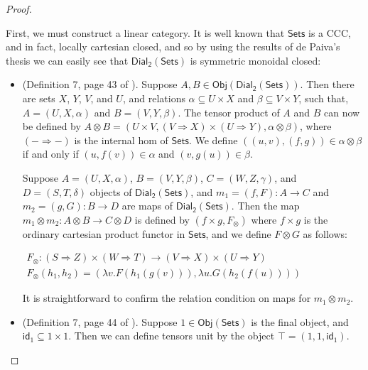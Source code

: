 \documentclass{elsarticle}
\newcommand{\dial}[0]{\mathsf{Dial_2}(\mathsf{Sets})}
\newcommand{\sets}[0]{\mathsf{Sets}}
\newcommand{\obj}[1]{\mathsf{Obj}(#1)}
\newcommand{\id}[0]{\mathsf{id}}
\begin{document}
\begin{proof}
\begin{report}
  First, we must construct a linear category. It is well known that
  $\mathsf{Sets}$ is a CCC, and in fact, locally cartesian closed, and
  so by using the results of de Paiva's thesis we can easily see that
  $\dial$ is symmetric monoidal closed:
  \begin{center}
    \begin{itemize}
    \item (Definition 7, page 43 of \cite{dePaiva:1988}). Suppose
      $A,B \in \obj{\dial}$.  Then there are sets $X$, $Y$, $V$, and
      $U$, and relations $\alpha \subseteq U \times X$ and
      $\beta \subseteq V \times Y$, such that, $A = (U,X,\alpha)$ and
      $B = (V,Y,\beta)$.  The tensor product of $A$ and $B$ can now be
      defined by $A \otimes B = (U \times V, (V \Rightarrow X) \times
      (U \Rightarrow Y),\alpha \otimes \beta)$, where $(- \Rightarrow
      -)$ is the internal hom of $\mathsf{Sets}$.  We define
      $((u,v),(f,g)) \in \alpha \otimes \beta$ if and only if
      $(u,f(v)) \in \alpha$ and $(v,g(u)) \in \beta$.  

      Suppose $A = (U,X,\alpha)$, $B = (V,Y,\beta)$,
      $C = (W,Z,\gamma)$, and $D = (S,T,\delta)$ objects of $\dial$,
      and $m_1 = (f, F) : A \to C$ and $m_2 = (g,G) : B \to D$ are
      maps of $\dial$.  Then the map $m_1 \otimes m_2 : A \otimes B
      \to C \otimes D$ is defined by $(f \times g, F_\otimes)$ where
      $f \times g$ is the ordinary cartesian product functor in
      $\sets$, and we define $F \otimes G$ as follows:
      \begin{center}
        \begin{math}
          \begin{array}{lll}
            F_\otimes : (S \Rightarrow Z) \times (W \Rightarrow T) \to (V \Rightarrow X) \times (U \Rightarrow Y)\\
            F_\otimes(h_1,h_2) = (\lambda v.F(h_1(g(v))),\lambda u.G(h_2(f(u))))
          \end{array}
        \end{math}
      \end{center}
      It is straightforward to confirm the relation condition on maps
      for $m_1 \otimes m_2$.

    \item (Definition 7, page 44 of \cite{dePaiva:1988}). Suppose
      $1 \in \obj{\sets}$ is the final object, and
      $\id_1 \subseteq 1 \times 1$.  Then we can define tensors
      unit by the object $\top = (1,1,\id_1)$.


\end{itemize}
\end{center}
\end{report}
\end{proof}
\end{document}
